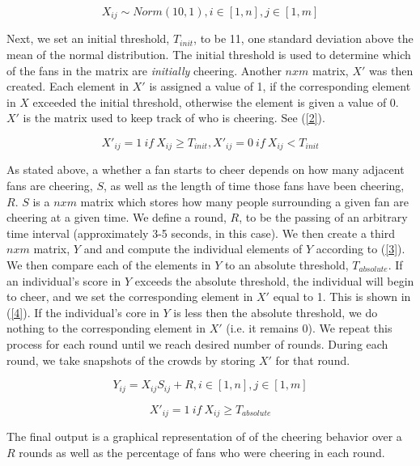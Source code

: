 \documentclass[oneside,12pt]{report}
\begin{document}
\begin{equation}
X_{ij}\sim Norm(10,1), i\in[1,n], j\in[1,m]
\label{1}
\end{equation}

Next, we set an initial threshold, $T_{init}$, to be 11, one standard deviation above the mean of the normal distribution. The initial threshold is used to determine which of the fans in the matrix are \textit{initially} cheering. Another $nxm$ matrix, $X'$ was then created. Each element in $X'$ is assigned a value of 1, if the corresponding element in $X$ exceeded the initial threshold, otherwise the element is given a value of 0. $X'$ is the matrix used to keep track of who is cheering. See (\ref{2}).

\begin{equation}
X'_{ij}=1~if~X_{ij}\geq T_{init}, X'_{ij}=0~if~X_{ij}<T_{init}
\label{2}
\end{equation}

As stated above, a whether a fan starts to cheer depends on how many adjacent fans are cheering, $S$, as well as the length of time those fans have been cheering, $R$. $S$ is a $nxm$ matrix which stores how many people surrounding a given fan are cheering at a given time. We define a round, $R$, to be the passing of an arbitrary time interval (approximately 3-5 seconds, in this case). We then create a third $nxm$ matrix, $Y$ and and compute the individual elements of $Y$ according to (\ref{3}). We then compare each of the elements in $Y$ to an absolute threshold, $T_{absolute}$. If an individual's score in $Y$ exceeds the absolute threshold, the individual will begin to cheer, and we set the corresponding element in $X'$ equal to 1.  This is shown in (\ref{4}). If the individual's core in $Y$ is less then the absolute threshold, we do nothing to the corresponding element in $X'$ (i.e. it remains 0). We repeat this process for each round until we reach desired number of rounds. During each round, we take snapshots of the crowds by storing $X'$ for that round. 

\begin{equation}
Y_{ij}=X_{ij}S_{ij}+R, i\in[1,n], j\in[1,m]
\label{3}
\end{equation}

\begin{equation}
X'_{ij}=1~if~X_{ij}\geq T_{absolute}
\label{4}
\end{equation}

The final output is a graphical representation of of the cheering behavior over a $R$ rounds as well as the percentage of fans who were cheering in each round.
\end{document}
